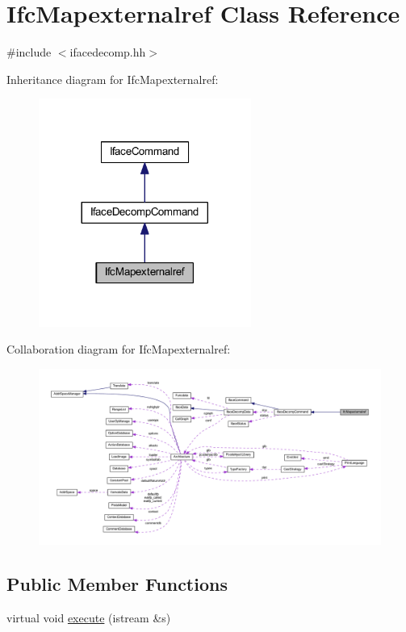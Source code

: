 \hypertarget{class_ifc_mapexternalref}{}\section{Ifc\+Mapexternalref Class Reference}
\label{class_ifc_mapexternalref}


{\ttfamily \#include $<$ifacedecomp.\+hh$>$}



Inheritance diagram for Ifc\+Mapexternalref\+:
\nopagebreak
\begin{figure}[H]
\begin{center}
\leavevmode
\includegraphics[width=197pt]{class_ifc_mapexternalref__inherit__graph}
\end{center}
\end{figure}


Collaboration diagram for Ifc\+Mapexternalref\+:
\nopagebreak
\begin{figure}[H]
\begin{center}
\leavevmode
\includegraphics[width=350pt]{class_ifc_mapexternalref__coll__graph}
\end{center}
\end{figure}
\subsection*{Public Member Functions}
\begin{DoxyCompactItemize}
\item 
virtual void \mbox{\hyperlink{class_ifc_mapexternalref_a81048b8beac5fa5bfd987a4ac3a5b6b1}{execute}} (istream \&s)
\end{DoxyCompactItemize}
